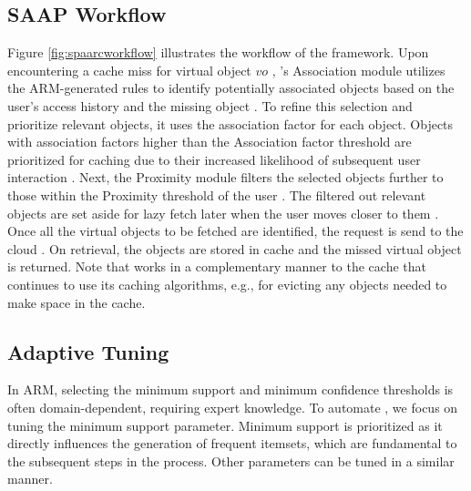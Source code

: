              \subsection{SAAP Workflow}
            Figure \ref{fig:spaarcworkflow} illustrates the workflow of the \spaarc{} framework. Upon encountering a cache miss for virtual object $vo$ , \spaarc's Association module utilizes the ARM-generated rules to identify potentially associated objects based on the user's access history and the missing object . To refine this selection and prioritize relevant objects, it uses the association factor for each object. Objects with association factors higher than the Association factor threshold are prioritized for caching due to their increased likelihood of subsequent user interaction .
            Next, the Proximity module filters the selected objects further to those within the Proximity threshold of the user . The filtered out relevant objects are set aside for lazy fetch later when the user moves closer to them .
            Once all the virtual objects to be fetched are identified, the request is send to the cloud . On retrieval, the objects are stored in cache and the missed virtual object is returned. Note that \spaarc{} works in a complementary manner to the cache that continues to use its caching algorithms, e.g., for evicting any objects needed to make space in the cache.

            
    \subsection{Adaptive Tuning}
        In ARM, selecting the minimum support and minimum confidence thresholds is often domain-dependent, requiring expert knowledge. To automate \spaarc, we focus on tuning the minimum support parameter. Minimum support is prioritized as it directly influences the generation of frequent itemsets, which are fundamental to the subsequent steps in the process. Other parameters can be tuned in a similar manner.

